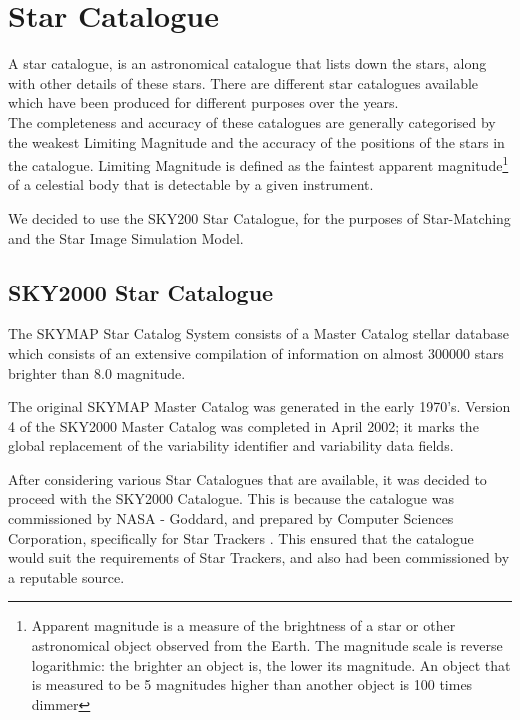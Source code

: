 \documentclass[../../main.tex]{subfiles}
\begin{document}
\section{Star Catalogue}
\label{appendix:star_catalogue}
\thispagestyle{fancy}


A star catalogue, is an astronomical catalogue that lists down the stars, along with other details of these stars.
There are different star catalogues available which have been produced for different purposes over the years. \\
The completeness and accuracy of these catalogues are generally categorised by the weakest Limiting Magnitude and the accuracy of the positions of the stars in the catalogue. 
Limiting Magnitude is defined as the faintest apparent magnitude\footnote{Apparent magnitude is a measure of the brightness of a star or other astronomical object observed from the Earth. The magnitude scale is reverse logarithmic: the brighter an object is, the lower its magnitude. An object that is measured to be 5 magnitudes higher than another object is 100 times dimmer} of a celestial body that is detectable by a given instrument.

We decided to use the SKY200 Star Catalogue, for the purposes of Star-Matching and the Star Image Simulation Model. 

\subsection{SKY2000 Star Catalogue}

The SKYMAP Star Catalog System consists of a Master Catalog stellar database which consists of an extensive compilation of information on almost 300000 stars brighter than $8.0$ magnitude. 

The original SKYMAP Master Catalog was generated in the early 1970's. Version 4 of the SKY2000 Master Catalog was completed in April 2002; it marks the global replacement of the variability identifier and variability data fields. 

After considering various Star Catalogues that are available, it was decided to proceed with the SKY2000 Catalogue. This is because the catalogue was commissioned by NASA - Goddard, and prepared by Computer Sciences Corporation, specifically for Star Trackers \cite{sande1999skymap}.
This ensured that the catalogue would suit the requirements of Star Trackers, and also had been commissioned by a reputable source.
\end{document}
